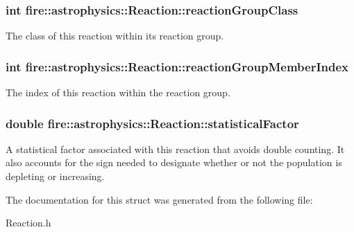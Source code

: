 \subsubsection[{\texorpdfstring{reaction\+Group\+Class}{reactionGroupClass}}]{\setlength{\rightskip}{0pt plus 5cm}int fire\+::astrophysics\+::\+Reaction\+::reaction\+Group\+Class}\hypertarget{a00022_ab6d29b5c28ef33ea1d9219b70f02d98a}{}\label{a00022_ab6d29b5c28ef33ea1d9219b70f02d98a}
The class of this reaction within its reaction group. 
\subsubsection[{\texorpdfstring{reaction\+Group\+Member\+Index}{reactionGroupMemberIndex}}]{\setlength{\rightskip}{0pt plus 5cm}int fire\+::astrophysics\+::\+Reaction\+::reaction\+Group\+Member\+Index}\hypertarget{a00022_adb666fe2c511b5a5e86ebcd35ba7faa4}{}\label{a00022_adb666fe2c511b5a5e86ebcd35ba7faa4}
The index of this reaction within the reaction group. 
\subsubsection[{\texorpdfstring{statistical\+Factor}{statisticalFactor}}]{\setlength{\rightskip}{0pt plus 5cm}double fire\+::astrophysics\+::\+Reaction\+::statistical\+Factor}\hypertarget{a00022_a439daff55fecd97cafc96f204570376a}{}\label{a00022_a439daff55fecd97cafc96f204570376a}
A statistical factor associated with this reaction that avoids double counting. It also accounts for the sign needed to designate whether or not the population is depleting or increasing. 

The documentation for this struct was generated from the following file\+:\begin{DoxyCompactItemize}
\item 
Reaction.\+h\end{DoxyCompactItemize}
